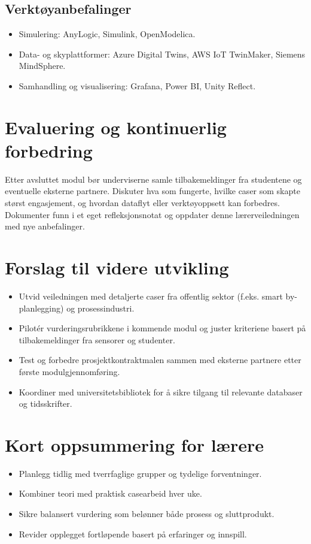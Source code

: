 \subsection{Verktøyanbefalinger}
\begin{itemize}
    \item Simulering: AnyLogic, Simulink, OpenModelica.
    \item Data- og skyplattformer: Azure Digital Twins, AWS IoT TwinMaker, Siemens MindSphere.
    \item Samhandling og visualisering: Grafana, Power BI, Unity Reflect.
\end{itemize}

\section{Evaluering og kontinuerlig forbedring}
Etter avsluttet modul bør underviserne samle tilbakemeldinger fra studentene og eventuelle eksterne partnere. Diskuter hva som fungerte, hvilke caser som skapte størst engasjement, og hvordan dataflyt eller verktøyoppsett kan forbedres. Dokumenter funn i et eget refleksjonsnotat og oppdater denne lærerveiledningen med nye anbefalinger.

\section{Forslag til videre utvikling}
\begin{itemize}
    \item Utvid veiledningen med detaljerte caser fra offentlig sektor (f.eks. smart by-planlegging) og prosessindustri.
    \item Pilotér vurderingsrubrikkene i kommende modul og juster kriteriene basert på tilbakemeldinger fra sensorer og studenter.
    \item Test og forbedre prosjektkontraktmalen sammen med eksterne partnere etter første modulgjennomføring.
    \item Koordiner med universitetsbibliotek for å sikre tilgang til relevante databaser og tidsskrifter.
\end{itemize}

\section{Kort oppsummering for lærere}
\begin{itemize}
    \item Planlegg tidlig med tverrfaglige grupper og tydelige forventninger.
    \item Kombiner teori med praktisk casearbeid hver uke.
    \item Sikre balansert vurdering som belønner både prosess og sluttprodukt.
    \item Revider opplegget fortløpende basert på erfaringer og innspill.
\end{itemize}


